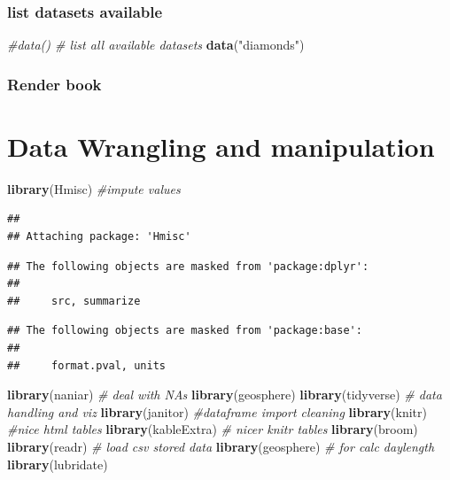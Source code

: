 \documentclass[
]{article}
\newenvironment{Shaded}{\begin{snugshade}}{\end{snugshade}}
\newcommand{\CommentTok}[1]{\textcolor[rgb]{0.56,0.35,0.01}{\textit{#1}}}
\newcommand{\FunctionTok}[1]{\textcolor[rgb]{0.13,0.29,0.53}{\textbf{#1}}}
\newcommand{\NormalTok}[1]{#1}
\newcommand{\StringTok}[1]{\textcolor[rgb]{0.31,0.60,0.02}{#1}}
\begin{document}
\hypertarget{list-datasets-available}{%
\subsubsection{list datasets available}\label{list-datasets-available}}

\begin{Shaded}
\begin{Highlighting}[]
\CommentTok{\#data() \# list all available datasets}
\FunctionTok{data}\NormalTok{(}\StringTok{"diamonds"}\NormalTok{)}
\end{Highlighting}
\end{Shaded}

\hypertarget{render-book}{%
\subsubsection{Render book}\label{render-book}}

\hypertarget{data-wrangling-and-manipulation}{%
\section{Data Wrangling and manipulation}\label{data-wrangling-and-manipulation}}

\begin{Shaded}
\begin{Highlighting}[]
\FunctionTok{library}\NormalTok{(Hmisc) }\CommentTok{\#impute values}
\end{Highlighting}
\end{Shaded}

\begin{verbatim}
## 
## Attaching package: 'Hmisc'
\end{verbatim}

\begin{verbatim}
## The following objects are masked from 'package:dplyr':
## 
##     src, summarize
\end{verbatim}

\begin{verbatim}
## The following objects are masked from 'package:base':
## 
##     format.pval, units
\end{verbatim}

\begin{Shaded}
\begin{Highlighting}[]
\FunctionTok{library}\NormalTok{(naniar) }\CommentTok{\# deal with NAs}
\FunctionTok{library}\NormalTok{(geosphere)}
\FunctionTok{library}\NormalTok{(tidyverse) }\CommentTok{\# data handling and viz}
\FunctionTok{library}\NormalTok{(janitor) }\CommentTok{\#dataframe import cleaning}
\FunctionTok{library}\NormalTok{(knitr) }\CommentTok{\#nice html tables}
\FunctionTok{library}\NormalTok{(kableExtra) }\CommentTok{\# nicer knitr tables}
\FunctionTok{library}\NormalTok{(broom)}
\FunctionTok{library}\NormalTok{(readr) }\CommentTok{\# load csv stored data}
\FunctionTok{library}\NormalTok{(geosphere) }\CommentTok{\# for calc daylength}
\FunctionTok{library}\NormalTok{(lubridate)}
\end{Highlighting}
\end{Shaded}
\end{document}
